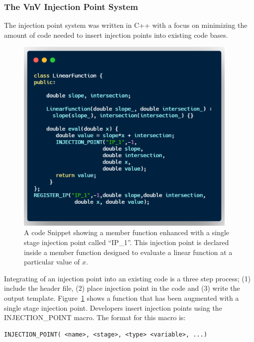 \subsubsection{The VnV Injection Point System}

The injection point system was written in C++ with a focus on minimizing the amount of 
code needed to insert injection points into existing code bases. 

\begin{figure}
 \includegraphics[width=0.95\textwidth]{./narrative/figures/linear-func.png}
 \caption{A code Snippet showing a member function enhanced with a single stage injection point called ``IP\_1''. This injection point is declared inside a member function 
 designed to evaluate a linear function at a particular value of $x$. \label{fig:example}}
\end{figure}

Integrating of an injection point into an existing code is a three step process; (1) include the header file, (2) place injection point in the code and (3) write the output template. Figure~\ref{fig:example} shows a function that has been augmented with a single stage injection point. Developers insert injection points using the INJECTION\_POINT macro. The format for this macro is:

\begin{verbatim} 
INJECTION_POINT( <name>, <stage>, <type> <variable>, ...)
\end{verbatim}

